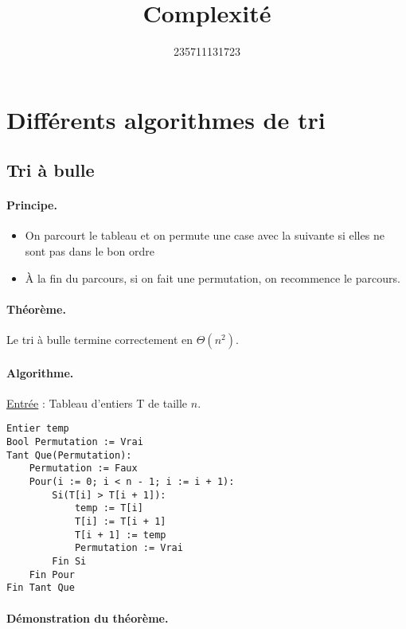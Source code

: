 \documentclass{article}
\title{Complexité}
\author{235711131723}
\begin{document}
    \maketitle

    \section{Différents algorithmes de tri}

    \subsection{Tri à bulle}

    \paragraph{Principe.}

    \begin{itemize}
        \item On parcourt le tableau et on permute une case avec la suivante si elles ne sont pas dans le bon ordre
        \item À la fin du parcours, si on fait une permutation, on recommence le parcours.
    \end{itemize}

    \paragraph{Théorème.} Le tri à bulle termine correctement en $\Theta(n^2)$.

    \paragraph{Algorithme.}

    \underline{Entrée} : Tableau d'entiers T de taille $n$.

    \begin{lstlisting}
Entier temp
Bool Permutation := Vrai
Tant Que(Permutation):
    Permutation := Faux
    Pour(i := 0; i < n - 1; i := i + 1):
        Si(T[i] > T[i + 1]):
            temp := T[i]
            T[i] := T[i + 1]
            T[i + 1] := temp
            Permutation := Vrai
        Fin Si
    Fin Pour
Fin Tant Que
    \end{lstlisting}

    \paragraph{Démonstration du théorème.}
\end{document}
